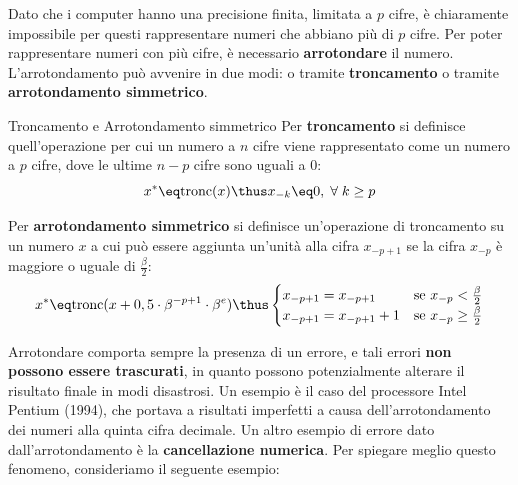 Dato che i computer hanno una precisione finita, limitata a $p$ cifre, è chiaramente impossibile per questi rappresentare numeri che abbiano più di $p$ cifre. Per poter rappresentare numeri con più cifre, è necessario \textbf{arrotondare} il numero. L'arrotondamento può avvenire in due modi: o tramite \textbf{troncamento} o tramite \textbf{arrotondamento simmetrico}.

\begin{definition}{Troncamento e Arrotondamento simmetrico}
    Per \textbf{troncamento} si definisce quell'operazione per cui un numero a $n$ cifre viene rappresentato come un numero a $p$ cifre, dove le ultime $n - p$ cifre sono uguali a 0:
    \[ x^* \eq \text{tronc}(x) \thus x_{-k} \eq 0, \; \forall \; k \geq p \]

    Per \textbf{arrotondamento simmetrico} si definisce un'operazione di troncamento su un numero $x$ a cui può essere aggiunta un'unità alla cifra $x_{-p + 1}$ se la cifra $x_{-p}$ è maggiore o uguale di $\frac{\beta}{2}$:
    \[ x^* \eq \text{tronc}(x + 0,5 \cdot \beta^{-p+1} \cdot \beta^e) \thus \begin{cases}
        x_{-p + 1} = x_{-p + 1} & \text{se } x_{-p} < \frac{\beta}{2} \\
        x_{-p + 1} = x_{-p + 1} + 1 & \text{se } x_{-p} \geq \frac{\beta}{2}
    \end{cases}\]
\end{definition}

Arrotondare comporta sempre la presenza di un errore, e tali errori \textbf{non possono essere trascurati}, in quanto possono potenzialmente alterare il risultato finale in modi disastrosi. Un esempio è il caso del processore Intel Pentium (1994), che portava a risultati imperfetti a causa dell'arrotondamento dei numeri alla quinta cifra decimale.
\nwl
Un altro esempio di errore dato dall'arrotondamento è la \textbf{cancellazione numerica}. Per spiegare meglio questo fenomeno, consideriamo il seguente esempio:


